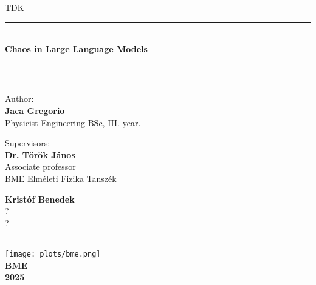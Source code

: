 \documentclass[a4paper,12pt]{article}
\begin{document}
\begin{titlepage}
\newcommand{\HRule}{\rule{\linewidth}{0.5mm}}
\center
\huge\textsc{TDK}
\HRule \\[0.4cm]
{ \huge \bfseries Chaos in Large Language Models}\\[0.2cm] 
\HRule \\[0.5cm]
\begin{minipage}[t]{0.4\textwidth}
\begin{flushleft} \large
Author: \\
\Large\textbf{Jaca Gregorio}\\
\large{Physicist Engineering BSc, III. year.}
\end{flushleft}
\end{minipage}
\qquad
\begin{minipage}[t]{0.4\textwidth}
\begin{flushleft}\large
Supervisors: \\
\Large\textbf{Dr. Török János}\\
\large Associate professor \\
BME Elméleti Fizika Tanszék

\Large\textbf{Kristóf Benedek}\\
\large ? \\
?
\end{flushleft}
\end{minipage}
\\[6cm]
\texttt{[image: plots/bme.png]}\\[0.2cm]
\large{\textbf{BME}}\\
\large{\textbf{2025}}
\vfill
\end{titlepage}

\newpage\null\thispagestyle{empty}\newpage



\end{document}

